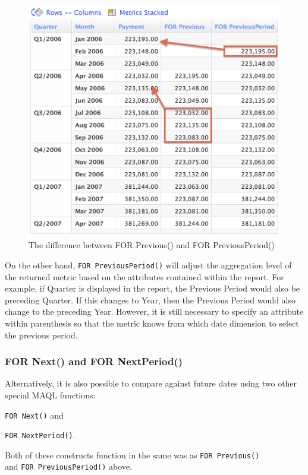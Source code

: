 \documentclass[a4paper, 12pt, titlepage, fleqn]{article}
\begin{document}
\begin{figure}[htb]
\centering
\includegraphics[scale=0.6]{images/4pr4pp.png}
\caption{The difference between FOR Previous() and FOR PreviousPeriod()}
\label{fig:4pp}
\end{figure}

On the other hand, \verb=FOR PreviousPeriod()= will adjust the aggregation level of the returned metric based on the attributes contained within the report. For example, if Quarter is displayed in the report, the Previous Period would also be preceding Quarter. If this changes to Year, then the Previous Period would also change to the preceding Year. However, it is still necessary to specify an attribute within parenthesis so that the metric knows from which date dimension to select the previous period.

\subsubsection{FOR Next() and FOR NextPeriod()}
Alternatively, it is also possible to compare against future dates using two other special MAQL functions:

\hspace{0.9cm}\verb=FOR Next()= and 

\hspace{0.9cm}\verb=FOR NextPeriod()=. 

Both of these constructs function in the same was as \verb=FOR Previous()=\\ and \verb=FOR PreviousPeriod()= above.
\end{document}
